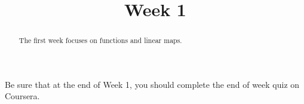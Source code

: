 \documentclass{ximera}
\title{Week 1}
\begin{document}
\begin{abstract}
  The first week focuses on functions and linear maps.
\end{abstract}


Be sure that at the end of Week 1, you should complete the end of week quiz on Coursera.
\end{document}
